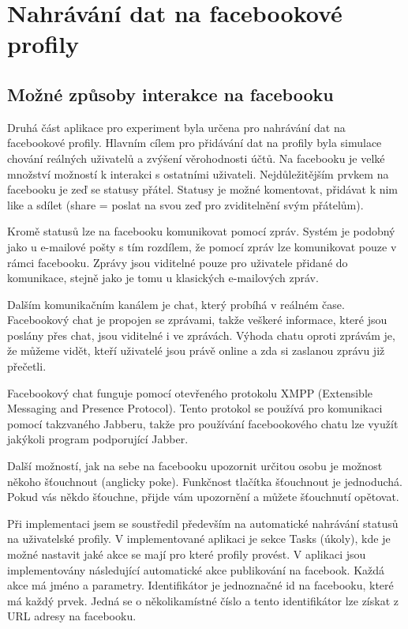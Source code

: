 \documentclass[thesis=M,czech]{FITthesis}[2013/05/10]
\begin{document}
\section{Nahrávání dat na facebookové profily}

\subsection{Možné způsoby interakce na facebooku}

Druhá část aplikace pro experiment byla určena pro nahrávání dat na facebookové profily. Hlavním cílem pro přidávání dat na profily byla simulace chování reálných uživatelů a zvýšení věrohodnosti účtů. Na facebooku je velké množství možností k interakci s ostatními uživateli. Nejdůležitějším prvkem na facebooku je zeď se statusy přátel. Statusy je možné komentovat, přidávat k nim like a sdílet (share = poslat na svou zeď pro zviditelnění svým přátelům). 

Kromě statusů lze na facebooku komunikovat pomocí zpráv. Systém je podobný jako u e-mailové pošty s tím rozdílem, že pomocí zpráv lze komunikovat pouze  v rámci facebooku. Zprávy jsou viditelné pouze pro uživatele přidané do komunikace, stejně jako je tomu u klasických e-mailových zpráv. 

Dalším komunikačním kanálem je chat, který probíhá v reálném čase. Facebookový chat je propojen se zprávami, takže veškeré informace, které jsou poslány přes chat, jsou viditelné i ve zprávách. Výhoda chatu oproti zprávám je, že  můžeme vidět, kteří uživatelé jsou právě online a zda si zaslanou zprávu již přečetli. 

Facebookový chat funguje pomocí otevřeného protokolu XMPP (Extensible Messaging and Presence Protocol). Tento protokol se používá pro komunikaci pomocí takzvaného Jabberu, takže pro používání facebookového chatu lze využít jakýkoli program podporující Jabber.

Další možností, jak na sebe na facebooku upozornit určitou osobu je možnost někoho šťouchnout (anglicky poke). Funkčnost tlačítka šťouchnout je jednoduchá. Pokud vás někdo šťouchne, přijde vám upozornění a můžete šťouchnutí opětovat. %

Při implementaci jsem se soustředil především na automatické nahrávání statusů na uživatelské profily. V implementované aplikaci je sekce Tasks (úkoly), kde je možné nastavit jaké akce se mají pro které profily provést. V aplikaci jsou implementovány následující automatické akce publikování na facebook. Každá akce má jméno a parametry. Identifikátor je jednoznačné id na facebooku, které má každý prvek. Jedná se o několikamístné číslo a tento identifikátor lze získat z URL adresy na facebooku.
\end{document}
